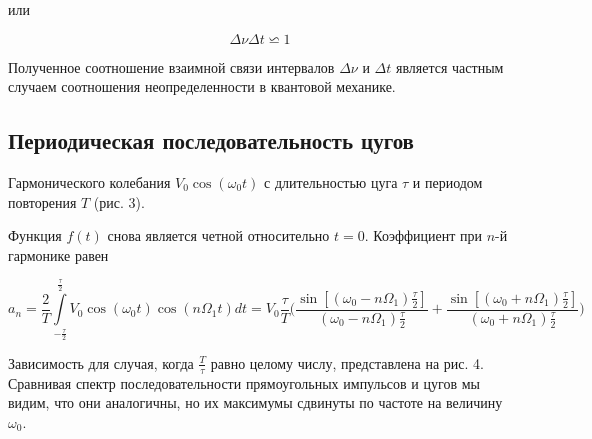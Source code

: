 	 или 
	
\begin{equation}\label{neopr}
	\Delta \nu \Delta t \backsimeq 1
\end{equation}
		
	Полученное соотношение взаимной связи интервалов $\Delta \nu$ и $\Delta t$ является
	частным случаем соотношения неопределенности в квантовой механике.
	
	\subsection{Периодическая последовательность цугов} 
	Гармонического колебания $V_{0}\cos(\omega_{0}t)$ с длительностью цуга $\tau$ и периодом повторения $T$ (рис. 3).
	
	Функция $f(t)$ снова является четной относительно $t=0$. Коэффициент при $n$-й гармонике равен
	
	$$a_{n}=\dfrac{2}{T}\int\limits_{-\frac{\tau}{2}}^{\frac{\tau}{2}}V_{0}\cos(\omega_{0}t)\cos(n \Omega_{1} t)dt=V_{0}\dfrac{\tau}{T} \bigg(\dfrac{\sin[(\omega_{0}-n\Omega_{1})\frac{\tau}{2}]}{(\omega_{0}-n\Omega_{1})\frac{\tau}{2}}+\dfrac{\sin[(\omega_{0}+n\Omega_{1})\frac{\tau}{2}]}{(\omega_{0}+n\Omega_{1})\frac{\tau}{2}} \bigg)$$ 
	
	Зависимость для случая, когда $\frac{T}{\tau}$ равно целому числу, представлена на рис. 4. Сравнивая спектр последовательности прямоугольных импульсов и цугов мы видим, что они аналогичны, но их максимумы сдвинуты по частоте на величину $\omega_{0}$.
	
